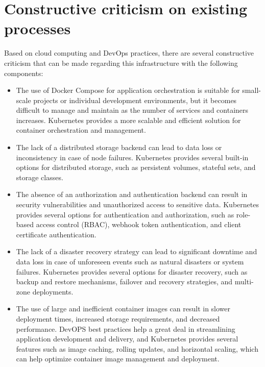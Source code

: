 \section{Constructive criticism on existing processes} 

Based on cloud computing and DevOps practices, there are several constructive criticism that can be made regarding this infrastructure with the following components: 

\begin{itemize}[label={--}]

\item The use of Docker Compose for application orchestration is suitable for small-scale projects or individual development environments, but it becomes difficult to manage and maintain as the number of services and containers increases. Kubernetes provides a more scalable and efficient solution for container orchestration and management. 

\item The lack of a distributed storage backend can lead to data loss or inconsistency in case of node failures. Kubernetes provides several built-in options for distributed storage, such as persistent volumes, stateful sets, and storage classes. 

\item The absence of an authorization and authentication backend can result in security vulnerabilities and unauthorized access to sensitive data. Kubernetes provides several options for authentication and authorization, such as role-based access control (RBAC), webhook token authentication, and client certificate authentication. 

\item The lack of a disaster recovery strategy can lead to significant downtime and data loss in case of unforeseen events such as natural disasters or system failures. Kubernetes provides several options for disaster recovery, such as backup and restore mechanisms, failover and recovery strategies, and multi-zone deployments. 

\item The use of large and inefficient container images can result in slower deployment times, increased storage requirements, and decreased performance. DevOPS best practices help a great deal in streamlining application development and delivery, and Kubernetes provides several features such as image caching, rolling updates, and horizontal scaling, which can help optimize container image management and deployment. 

\end{itemize}

